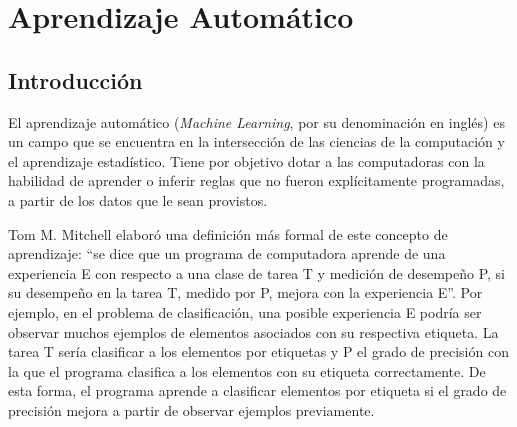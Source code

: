 \documentclass[a4paper,11pt,spanish]{book}
\begin{document}



  \section{Aprendizaje Automático}
    \subsection{Introducción}
      El aprendizaje automático (\emph{Machine Learning}, por su denominación en inglés) es un campo que se encuentra en la intersección de las ciencias de la computación
      y el aprendizaje estadístico. 
      Tiene por objetivo dotar a las computadoras con la habilidad de aprender o inferir reglas que no fueron explícitamente programadas, a partir
      de los datos que le sean provistos.

      Tom M. Mitchell  \cite{Mitchell:1997:ML:541177} elaboró una definición más formal de este concepto de aprendizaje: “se dice que un programa de computadora aprende de una experiencia E con 
      respecto a una clase de tarea T y medición de desempeño P, si su desempeño en la tarea T, medido por P, mejora con la experiencia E”. 
      Por ejemplo, en el problema de clasificación, una posible experiencia E podría ser observar muchos ejemplos de elementos asociados con su respectiva etiqueta. 
      La tarea T sería clasificar a los elementos por etiquetas y P el grado de precisión con la que el programa clasifica a los elementos con su etiqueta correctamente. 
      De esta forma, el programa aprende a clasificar elementos por etiqueta si el grado de precisión mejora a partir de observar ejemplos previamente.
\end{document}
